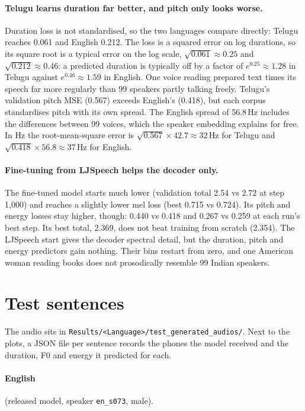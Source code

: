 \documentclass[11pt,a4paper]{article}
\newcommand{\code}[1]{\texttt{#1}}
\begin{document}
\paragraph{Telugu learns duration far better, and pitch only looks worse.} Duration loss is not standardised, so
the two languages compare directly: Telugu reaches 0.061 and English 0.212. The loss is a squared error on log
durations, so its square root is a typical error on the log scale, $\sqrt{0.061}\approx0.25$ and
$\sqrt{0.212}\approx0.46$: a predicted duration is typically off by a factor of $e^{0.25}\approx1.28$ in Telugu
against $e^{0.46}\approx1.59$ in English. One voice reading prepared text times its speech
far more regularly than 99 speakers partly talking freely. Telugu's validation pitch MSE (0.567) exceeds English's
(0.418), but each corpus standardises pitch with its own spread. The English spread of 56.8\,Hz includes the
differences between 99 voices, which the speaker embedding explains for free. In Hz the root-mean-square error is
$\sqrt{0.567}\times42.7\approx32$\,Hz for Telugu and $\sqrt{0.418}\times56.8\approx37$\,Hz for English.

\paragraph{Fine-tuning from LJSpeech helps the decoder only.} The fine-tuned model starts much lower (validation
total 2.54 vs 2.72 at step 1,000) and reaches a slightly lower mel loss (best 0.715 vs 0.724). Its pitch and energy
losses stay higher, though: 0.440 vs 0.418 and 0.267 vs 0.259 at each run's best step. Its best total, 2.369, does
not beat training from scratch (2.354). The LJSpeech start gives the decoder spectral detail, but the duration, pitch and
energy predictors gain nothing. Their bins restart from zero, and one American woman reading books does not prosodically
resemble 99 Indian speakers.

\section{Test sentences}
\label{sec:test}
The audio sits in \code{Results/<Language>/test\_generated\_audios/}. Next to the plots, a JSON file per sentence
records the phones the model received and the duration, F0 and energy it predicted for each.

\paragraph{English} (released model, speaker \code{en\_s073}, male).
\end{document}
